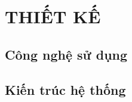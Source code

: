 \section{THIẾT KẾ}
\subsection{Công nghệ sử dụng}

\subsection{Kiến trúc hệ thống}

% 



% 
% 

% 
% 
% 
% 
